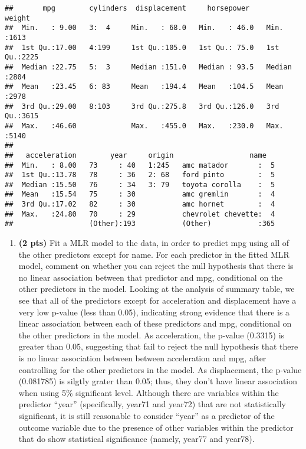 \documentclass[
]{article}
\providecommand{\tightlist}{%
  \setlength{\itemsep}{0pt}\setlength{\parskip}{0pt}}
\begin{document}
\begin{verbatim}
##       mpg        cylinders  displacement     horsepower        weight    
##  Min.   : 9.00   3:  4     Min.   : 68.0   Min.   : 46.0   Min.   :1613  
##  1st Qu.:17.00   4:199     1st Qu.:105.0   1st Qu.: 75.0   1st Qu.:2225  
##  Median :22.75   5:  3     Median :151.0   Median : 93.5   Median :2804  
##  Mean   :23.45   6: 83     Mean   :194.4   Mean   :104.5   Mean   :2978  
##  3rd Qu.:29.00   8:103     3rd Qu.:275.8   3rd Qu.:126.0   3rd Qu.:3615  
##  Max.   :46.60             Max.   :455.0   Max.   :230.0   Max.   :5140  
##                                                                          
##   acceleration        year     origin                  name    
##  Min.   : 8.00   73     : 40   1:245   amc matador       :  5  
##  1st Qu.:13.78   78     : 36   2: 68   ford pinto        :  5  
##  Median :15.50   76     : 34   3: 79   toyota corolla    :  5  
##  Mean   :15.54   75     : 30           amc gremlin       :  4  
##  3rd Qu.:17.02   82     : 30           amc hornet        :  4  
##  Max.   :24.80   70     : 29           chevrolet chevette:  4  
##                  (Other):193           (Other)           :365
\end{verbatim}

\begin{enumerate}
\def\labelenumi{(\alph{enumi})}
\setcounter{enumi}{1}
\tightlist
\item
  \textbf{(2 pts)} Fit a MLR model to the data, in order to predict mpg
  using all of the other predictors except for name. For each predictor
  in the fitted MLR model, comment on whether you can reject the null
  hypothesis that there is no linear association between that predictor
  and mpg, conditional on the other predictors in the model. Looking at
  the analysis of summary table, we see that all of the predictors
  except for acceleration and displacement have a very low p-value (less
  than 0.05), indicating strong evidence that there is a linear
  association between each of these predictors and mpg, conditional on
  the other predictors in the model. As acceleration, the p-value
  (0.3315) is greater than 0.05, suggesting that fail to reject the null
  hypothesis that there is no linear association between between
  acceleration and mpg, after controlling for the other predictors in
  the model. As displacement, the p-value (0.081785) is silgtly grater
  than 0.05; thus, they don't have linear association when using 5\%
  significant level. Although there are variables within the predictor
  ``year'' (specifically, year71 and year72) that are not statistically
  significant, it is still reasonable to consider ``year'' as a
  predictor of the outcome variable due to the presence of other
  variables within the predictor that do show statistical significance
  (namely, year77 and year78).
\end{enumerate}
\end{document}
